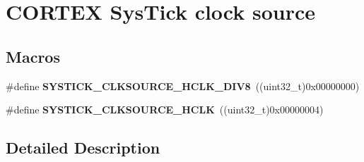 \hypertarget{group___c_o_r_t_e_x___sys_tick__clock__source}{\section{C\-O\-R\-T\-E\-X Sys\-Tick clock source}
\label{group___c_o_r_t_e_x___sys_tick__clock__source}
}
\subsection*{Macros}
\begin{DoxyCompactItemize}
\item 
\hypertarget{group___c_o_r_t_e_x___sys_tick__clock__source_ga1fd9b5bada2a8b2425a8523bc0fc7124}{\#define {\bfseries S\-Y\-S\-T\-I\-C\-K\-\_\-\-C\-L\-K\-S\-O\-U\-R\-C\-E\-\_\-\-H\-C\-L\-K\-\_\-\-D\-I\-V8}~((uint32\-\_\-t)0x00000000)}\label{group___c_o_r_t_e_x___sys_tick__clock__source_ga1fd9b5bada2a8b2425a8523bc0fc7124}

\item 
\hypertarget{group___c_o_r_t_e_x___sys_tick__clock__source_ga6f6582df23b6fbc578325e453b9893b7}{\#define {\bfseries S\-Y\-S\-T\-I\-C\-K\-\_\-\-C\-L\-K\-S\-O\-U\-R\-C\-E\-\_\-\-H\-C\-L\-K}~((uint32\-\_\-t)0x00000004)}\label{group___c_o_r_t_e_x___sys_tick__clock__source_ga6f6582df23b6fbc578325e453b9893b7}

\end{DoxyCompactItemize}


\subsection{Detailed Description}
